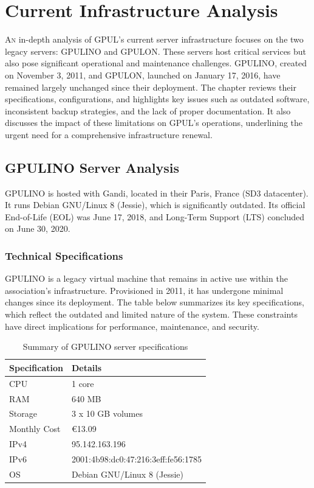 %

\chapter{Current Infrastructure Analysis}
\label{chap:current-infrastructure}

\lettrine{A}{n} in-depth analysis of GPUL's current server infrastructure focuses on the two legacy servers: GPULINO and GPULON. These servers host critical services but also pose significant operational and maintenance challenges. GPULINO, created on November 3, 2011, and GPULON, launched on January 17, 2016, have remained largely unchanged since their deployment. The chapter reviews their specifications, configurations, and highlights key issues such as outdated software, inconsistent backup strategies, and the lack of proper documentation. It also discusses the impact of these limitations on GPUL's operations, underlining the urgent need for a comprehensive infrastructure renewal.

\section{GPULINO Server Analysis}

GPULINO is hosted with Gandi, located in their Paris, France (SD3 datacenter). It runs Debian GNU/Linux 8 (Jessie), which is significantly outdated. Its official End-of-Life (EOL) was June 17, 2018, and Long-Term Support (LTS) concluded on June 30, 2020.

\subsection*{Technical Specifications}

GPULINO is a legacy virtual machine that remains in active use within the association's infrastructure. Provisioned in 2011, it has undergone minimal changes since its deployment. The table below summarizes its key specifications, which reflect the outdated and limited nature of the system. These constraints have direct implications for performance, maintenance, and security.

\begin{table}[H]
  \centering
  \caption{Summary of GPULINO server specifications}
  \label{tab:gpulino_specs}
  \begin{tabular}{ll}
    \rowcolor{udcpink!25}
    \textbf{Specification} & \textbf{Details} \\
    \hline
    CPU & 1 core \\
    RAM & 640 MB \\
    Storage & 3 x 10 GB volumes \\
    Monthly Cost & €13.09 \\
    IPv4 & 95.142.163.196 \\
    IPv6 & 2001:4b98:dc0:47:216:3eff:fe56:1785 \\
    OS & Debian GNU/Linux 8 (Jessie) \\
  \end{tabular}
\end{table}

